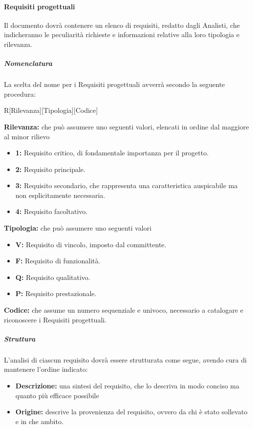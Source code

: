 \paragraph{Requisiti progettuali}
Il documento dovrà contenere un elenco di requisiti, redatto dagli Analisti, che indicheranno le peculiarità richieste e informazioni relative alla loro tipologia e rilevanza.

\subparagraph{Nomenclatura}
La scelta del nome per i Requisiti progettuali avverrà secondo la seguente procedura:
\begin{center}
R[Rilevanza][Tipologia][Codice]
\end{center}

\textbf{Rilevanza:} che può assumere uno seguenti valori, elencati in ordine dal maggiore al minor rilievo

\begin{itemize}
	\item \textbf{1:} Requisito critico, di fondamentale importanza per il progetto.
	\item \textbf{2:} Requisito principale.
	\item \textbf{3:} Requisito secondario, che rappresenta una caratteristica auspicabile ma non esplicitamente necessaria.
	\item \textbf{4:} Requisito facoltativo.
\end{itemize}

\textbf{Tipologia:} che può assumere uno seguenti valori

  \begin{itemize}
  	\item \textbf{V:} Requisito di vincolo, imposto dal committente.
    \item \textbf{F:} Requisito di funzionalità.
    \item \textbf{Q:} Requisito qualitativo.
    \item \textbf{P:} Requisito prestazionale.
  \end{itemize}

\textbf{Codice:} che assume un numero sequenziale e univoco, necessario a catalogare e riconoscere i Requisiti progettuali.

\subparagraph{Struttura}
L'analisi di ciascun requisito dovrà essere strutturata come segue, avendo cura di mantenere l'ordine indicato:

\begin{itemize}
  \item \textbf{Descrizione:} una sintesi del requisito, che lo descriva in modo conciso ma quanto più efficace possibile
  \item \textbf{Origine:} descrive la provenienza del requisito, ovvero da chi è stato sollevato e in che ambito.
\end{itemize}

